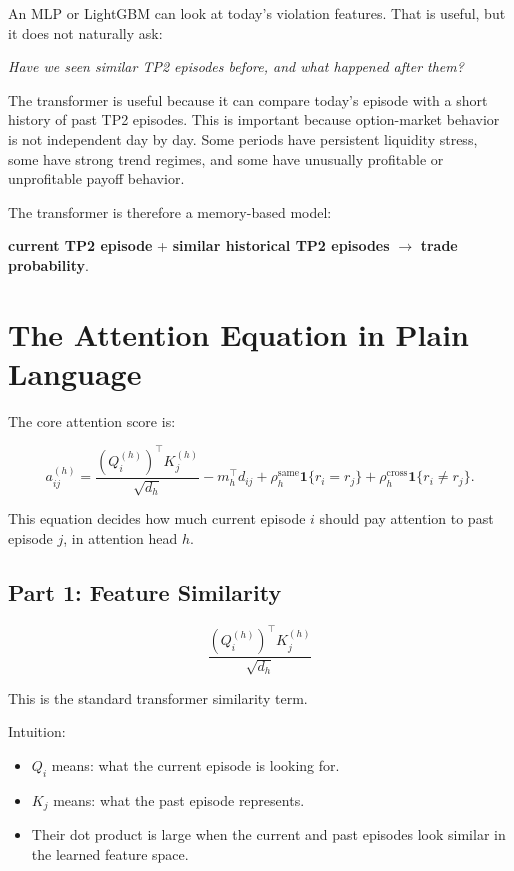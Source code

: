 \documentclass[11pt]{article}
\newcommand{\1}{\mathbf{1}}
\begin{document}
An MLP or LightGBM can look at today's violation features. That is useful, but
it does not naturally ask:

\begin{center}
\textit{Have we seen similar TP2 episodes before, and what happened after them?}
\end{center}

The transformer is useful because it can compare today's episode with a short
history of past TP2 episodes. This is important because option-market behavior
is not independent day by day. Some periods have persistent liquidity stress,
some have strong trend regimes, and some have unusually profitable or
unprofitable payoff behavior.

The transformer is therefore a memory-based model:

\begin{center}
\textbf{current TP2 episode} + \textbf{similar historical TP2 episodes}
\(\rightarrow\) \textbf{trade probability}.
\end{center}

\section{The Attention Equation in Plain Language}

The core attention score is:

\[
  a_{ij}^{(h)}
  =
  \frac{(Q_i^{(h)})^\top K_j^{(h)}}{\sqrt{d_h}}
  -
  m_h^\top d_{ij}
  +
  \rho_h^{\mathrm{same}}\1\{r_i=r_j\}
  +
  \rho_h^{\mathrm{cross}}\1\{r_i\neq r_j\}.
\]

This equation decides how much current episode \(i\) should pay attention to
past episode \(j\), in attention head \(h\).

\subsection{Part 1: Feature Similarity}

\[
  \frac{(Q_i^{(h)})^\top K_j^{(h)}}{\sqrt{d_h}}
\]

This is the standard transformer similarity term.

Intuition:

\begin{itemize}[leftmargin=*]
  \item \(Q_i\) means: what the current episode is looking for.
  \item \(K_j\) means: what the past episode represents.
  \item Their dot product is large when the current and past episodes look
        similar in the learned feature space.
\end{itemize}
\end{document}
